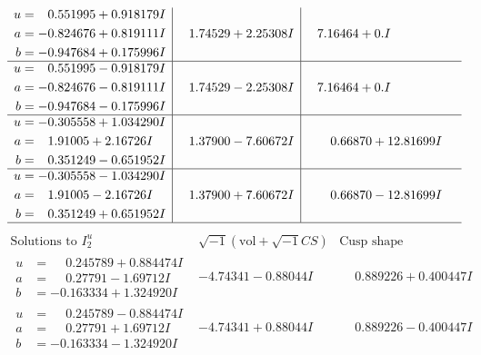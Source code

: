 \documentclass[1p]{elsarticle_modified}
\theoremstyle{definition}
\newcommand{\I}{\sqrt{-1}}
\begin{document}
$$\begin{array}{c|c|c}
\begin{aligned}
u &= \phantom{-}0.551995 + 0.918179 I \\
a &= -0.824676 + 0.819111 I \\
b &= -0.947684 + 0.175996 I\end{aligned}
 & \phantom{-}1.74529 + 2.25308 I & \phantom{-}7.16464 + 0. I\phantom{ +0.000000I} \\ \hline\begin{aligned}
u &= \phantom{-}0.551995 - 0.918179 I \\
a &= -0.824676 - 0.819111 I \\
b &= -0.947684 - 0.175996 I\end{aligned}
 & \phantom{-}1.74529 - 2.25308 I & \phantom{-}7.16464 + 0. I\phantom{ +0.000000I} \\ \hline\begin{aligned}
u &= -0.305558 + 1.034290 I \\
a &= \phantom{-}1.91005 + 2.16726 I \\
b &= \phantom{-}0.351249 - 0.651952 I\end{aligned}
 & \phantom{-}1.37900 - 7.60672 I & \phantom{-}0.66870 + 12.81699 I \\ \hline\begin{aligned}
u &= -0.305558 - 1.034290 I \\
a &= \phantom{-}1.91005 - 2.16726 I \\
b &= \phantom{-}0.351249 + 0.651952 I\end{aligned}
 & \phantom{-}1.37900 + 7.60672 I & \phantom{-}0.66870 - 12.81699 I\\
 \hline 
 \end{array}$$\newpage$$\begin{array}{c|c|c}  
\text{Solutions to }I^u_{2}& \I (\text{vol} + \sqrt{-1}CS) & \text{Cusp shape}\\
 \hline 
\begin{aligned}
u &= \phantom{-}0.245789 + 0.884474 I \\
a &= \phantom{-}0.27791 - 1.69712 I \\
b &= -0.163334 + 1.324920 I\end{aligned}
 & -4.74341 - 0.88044 I & \phantom{-}0.889226 + 0.400447 I \\ \hline\begin{aligned}
u &= \phantom{-}0.245789 - 0.884474 I \\
a &= \phantom{-}0.27791 + 1.69712 I \\
b &= -0.163334 - 1.324920 I\end{aligned}
 & -4.74341 + 0.88044 I & \phantom{-}0.889226 - 0.400447 I \\ \hline\begin{aligned}

\end{aligned}
\end{array}$$
\end{document}
